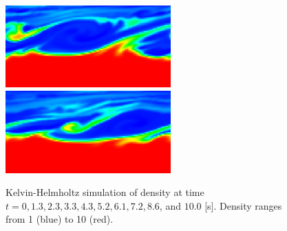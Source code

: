 \documentclass[final]{siamltex}
\begin{document}
\begin{figure}
\begin{center}
\includegraphics[width=2.5in]{KHLM8}
\includegraphics[width=2.5in]{KHLM9}
\caption{Kelvin-Helmholtz simulation of density at time
         $t=0, 1.3, 2.3, 3.3, 4.3, 5.2, 6.1, 7.2, 8.6$, and $10.0$ [s].
         Density ranges from 1 (blue) to 10 (red).}\label{fig:KHLM}
\end{center}
\end{figure}



\end{document}
